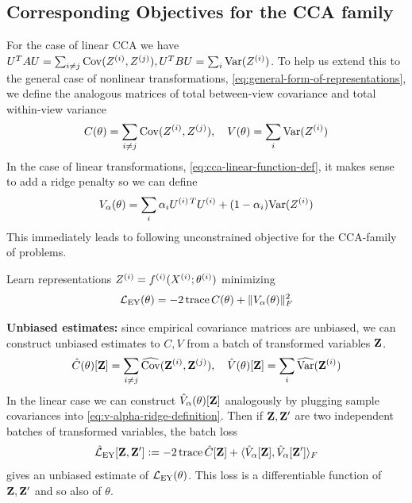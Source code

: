 \subsection{Corresponding Objectives for the CCA family}
For the case of linear CCA we have $U^T A U = \sum_{i \neq j} \mathrm{Cov}(Z^{(i)}, Z^{(j)}), U^T B U = \sum_{i} \mathrm{Var}(Z^{(i)})$.
To help us extend this to the general case of nonlinear transformations, \cref{eq:general-form-of-representations}, we define the analogous matrices of total between-view covariance and total within-view variance
\begin{align}\label{eq:def-C-V-matrices}
\vphantom{\bigl(\bigr)} %
C(\theta) = \sum_{i \neq j} \Cov(Z\sps{i}, Z\sps{j}), \quad
V(\theta) = \sum_{i} \Var(Z\sps{i})
\end{align}
In the case of linear transformations, \cref{eq:cca-linear-function-def}, it makes sense to add a ridge penalty so we can define
\begin{align}\label{eq:v-alpha-ridge-definition}
V_\alpha(\theta) = \sum_i \alpha_i {U^{(i)\,T}} U^{(i)} +  (1 - \alpha_i) \mathrm{Var}(Z^{(i)})
\end{align}
This immediately leads to following unconstrained objective for the CCA-family of problems.
\begin{definition}
    Learn representations $Z^{(i)} = f^{(i)}( X^{(i)}; \theta^{(i)})$ minimizing
    \begin{align}\label{eq:EY-loss-def-C-V}
    \mathcal{L}_\text{EY}(\theta) = - 2 \operatorname{trace} C(\theta) + \lVert V_\alpha(\theta)\rVert_F^2
    \end{align}
\end{definition}

\textbf{Unbiased estimates:}
since empirical covariance matrices are unbiased, we can construct unbiased estimates to $C, V$ from a batch of transformed variables $\mathbf{Z}$.
\begin{align}\label{eq:def-C-V-matrices-empirical}
\hat{C}(\theta)[\mathbf{Z}] = \sum_{i \neq j} \widehat{\mathrm{Cov}}(\mathbf{Z}^{(i)}, \mathbf{Z}^{(j)}), \quad
\hat{V}(\theta)[\mathbf{Z}] = \sum_{i} \widehat{\mathrm{Var}}(\mathbf{Z}^{(i)})
\end{align}
In the linear case we can construct $\hat{V}_\alpha(\theta)[\mathbf{Z}]$ analogously by plugging sample covariances into \cref{eq:v-alpha-ridge-definition}.
Then if $\mathbf{Z}, \mathbf{Z}'$ are two independent batches of transformed variables, the batch loss
\begin{align}\label{eq:empirical-EY-loss-estimate-def}
\hat{\mathcal{L}}_\text{EY}[\mathbf{Z}, \mathbf{Z}'] \vcentcolon= - 2 \operatorname{trace} \hat{C}[\mathbf{Z}] + \langle \hat{V}_\alpha[\mathbf{Z}], \hat{V}_\alpha[\mathbf{Z}'] \rangle_F
\end{align}
gives an unbiased estimate of $\mathcal{L}_\text{EY}(\theta)$.%
This loss is a differentiable function of $\mathbf{Z}, \mathbf{Z}'$ and so also of $\theta$.

